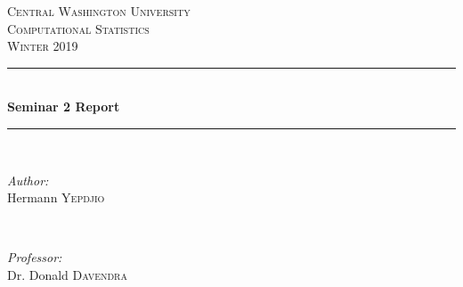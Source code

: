 \documentclass[12pt]{article}
\begin{document}
	
	\begin{titlepage}
		
		\newcommand{\HRule}{\rule{\linewidth}{0.5mm}} %
		
		\center %
		
		
		\textsc{\LARGE Central Washington University}\\[1.5cm] %
		\textsc{\Large Computational Statistics}\\[0.5cm] %
		\textsc{\large Winter 2019}\\[0.5cm] %
		
		
		\HRule \\[0.4cm]
		{ \huge \bfseries Seminar 2 Report}\\[0.4cm] %
		\HRule \\[1.5cm]
		
		
		\begin{minipage}{0.4\textwidth}
			\begin{flushleft} \large
				\emph{Author:}\\
				Hermann \textsc{Yepdjio} %
			\end{flushleft}
		\end{minipage}
		~
		\begin{minipage}{0.4\textwidth}
			\begin{flushright} \large
				\emph{Professor:} \\
				Dr. Donald \textsc{Davendra} %
			\end{flushright}
		\end{minipage}\\[1cm]
		

\end{titlepage}
\end{document}
